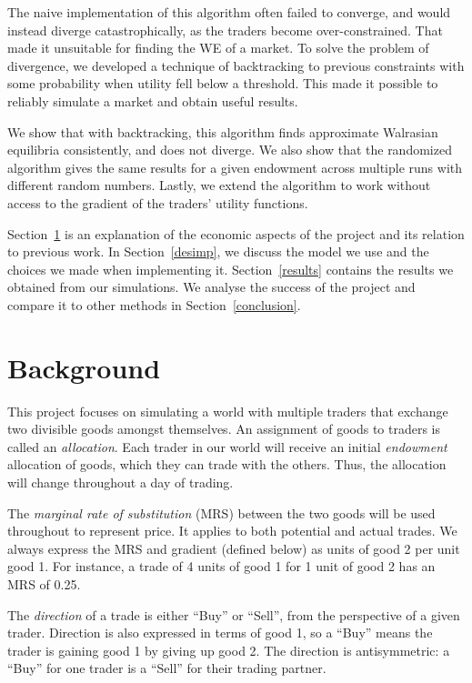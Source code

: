 \documentclass[12pt,a4paper,titlepage]{article}
\begin{document}
The naive implementation of this algorithm often failed to converge, and would instead diverge catastrophically, as the traders become over-constrained.
That made it unsuitable for finding the WE of a market.
To solve the problem of divergence, we developed a technique of backtracking to previous constraints with some probability when utility fell below a threshold.
This made it possible to reliably simulate a market and obtain useful results.

We show that with backtracking, this algorithm finds approximate Walrasian equilibria consistently, and does not diverge.
We also show that the randomized algorithm gives the same results for a given endowment across multiple runs with different random numbers.
Lastly, we extend the algorithm to work without access to the gradient of the traders' utility functions.

Section~\ref{background} is an explanation of the economic aspects of the project and its relation to previous work.
In Section~\ref{desimp}, we discuss the model we use and the choices we made when implementing it.
Section~\ref{results} contains the results we obtained from our simulations.
We analyse the success of the project and compare it to other methods in Section~\ref{conclusion}. 

\section{Background}\label{background}

This project focuses on simulating a world with multiple traders that exchange two divisible goods amongst themselves.
An assignment of goods to traders is called an \textit{allocation}.
Each trader in our world will receive an initial \textit{endowment} allocation of goods, which they can trade with the others.
Thus, the allocation will change throughout a day of trading.

The \textit{marginal rate of substitution} (MRS) between the two goods will be used throughout to represent price.
It applies to both potential and actual trades.
We always express the MRS and gradient (defined below) as units of good 2 per unit good 1.
For instance, a trade of 4 units of good 1 for 1 unit of good 2 has an MRS of 0.25.

The \textit{direction} of a trade is either ``Buy'' or ``Sell'', from the perspective of a given trader.
Direction is also expressed in terms of good 1, so a ``Buy'' means the trader is gaining good 1 by giving up good 2.
The direction is antisymmetric: a ``Buy'' for one trader is a ``Sell'' for their trading partner.
\end{document}
